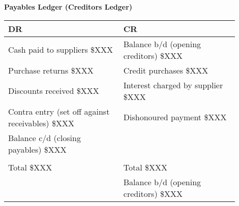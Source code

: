 \vspace{1cm}


\textbf{Payables Ledger (Creditors Ledger)}\\[3pt]
\begin{tabular}{@{}p{0.45\linewidth} p{0.45\linewidth}@{}}
\textbf{DR} & \textbf{CR} \\ \midrule
Cash paid to suppliers \hfill \$XXX & Balance b/d (opening creditors) \hfill \$XXX \\
Purchase returns \hfill \$XXX & Credit purchases \hfill \$XXX \\
Discounts received \hfill \$XXX & Interest charged by supplier \hfill \$XXX \\
Contra entry (set off against receivables) \hfill \$XXX & Dishonoured payment \hfill \$XXX \\
Balance c/d (closing payables) \hfill \$XXX & \\[3pt]
\multicolumn{2}{c}{\hrulefill} \\
Total \hfill \$XXX & Total \hfill \$XXX \\[6pt]
& Balance b/d (opening creditors) \hfill \$XXX \\
\end{tabular}

